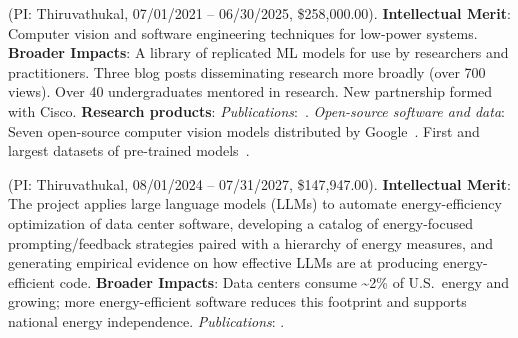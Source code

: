  (PI: Thiruvathukal, 07/01/2021 -- 06/30/2025, \$258,000.00).
\textbf{Intellectual Merit}: Computer vision and software engineering techniques for low-power systems.
\textbf{Broader Impacts}:
  A library of replicated ML models for use by researchers and practitioners.
  Three blog posts disseminating research more broadly (over 700 views).
  Over 40 undergraduates mentored in research.
  New partnership formed with Cisco.
\textbf{Research products}:
\emph{Publications}:~\cite{goel2021low,banna2021experience,goel2022efficient,goel2022tree,montes2022discrepancies,synovicSnapshotMetricsAre2022,veselsky2022v2vtrustHotMobile,jiang2023ptmtorrent,jiang2023empirical,huEvolutionWinningSolutions2023,davis2023reusing}.
\emph{Open-source software and data}:
Seven open-source computer vision models distributed by Google~\cite{YOLOObjectDetectors2021}.
First and largest datasets of pre-trained models~\cite{jiang2023ptmtorrentGlobus,jiang2023empirical}.




 (PI: Thiruvathukal, 08/01/2024 -- 07/31/2027, \$147,947.00).
\textbf{Intellectual Merit}: The project applies large language models (LLMs) to automate energy-efficiency optimization of data center software, developing a catalog of energy-focused prompting/feedback strategies paired with a hierarchy of energy measures, and generating empirical evidence on how effective LLMs are at producing energy-efficient code.
\textbf{Broader Impacts}: Data centers consume \textasciitilde 2\% of U.S.\ energy and growing; more energy-efficient software reduces this footprint and supports national energy independence. %
\emph{Publications}: \cite{peng2026agents,peng2026sysllmatic}.


